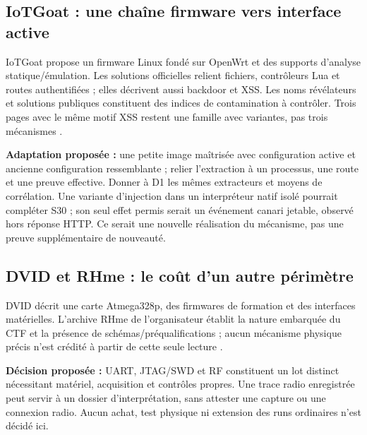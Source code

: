 \documentclass[11pt,a4paper]{article}
\begin{document}
\begin{samepage}\subsection{IoTGoat : une chaîne firmware vers interface active}
IoTGoat propose un firmware Linux fondé sur OpenWrt et des supports d'analyse statique/émulation. Les solutions officielles relient fichiers, contrôleurs Lua et routes authentifiées ; elles décrivent aussi backdoor et XSS. Les noms révélateurs et solutions publiques constituent des indices de contamination à contrôler. Trois pages avec le même motif XSS restent une famille avec variantes, pas trois mécanismes \cite{goat,goat-sol}.
\par\end{samepage}
\textbf{Adaptation proposée :} une petite image maîtrisée avec configuration active et ancienne configuration ressemblante ; relier l'extraction à un processus, une route et une preuve effective. Donner à D1 les mêmes extracteurs et moyens de corrélation. Une variante d'injection dans un interpréteur natif isolé pourrait compléter S30 ; son seul effet permis serait un événement canari jetable, observé hors réponse HTTP. Ce serait une nouvelle réalisation du mécanisme, pas une preuve supplémentaire de nouveauté.

\begin{samepage}\subsection{DVID et RHme : le coût d'un autre périmètre}
DVID décrit une carte Atmega328p, des firmwares de formation et des interfaces matérielles. L'archive RHme de l'organisateur établit la nature embarquée du CTF et la présence de schémas/préqualifications ; aucun mécanisme physique précis n'est crédité à partir de cette seule lecture \cite{dvid,rhme}.
\par\end{samepage}
\textbf{Décision proposée :} UART, JTAG/SWD et RF constituent un lot distinct nécessitant matériel, acquisition et contrôles propres. Une trace radio enregistrée peut servir à un dossier d'interprétation, sans attester une capture ou une connexion radio. Aucun achat, test physique ni extension des runs ordinaires n'est décidé ici.
\end{document}
